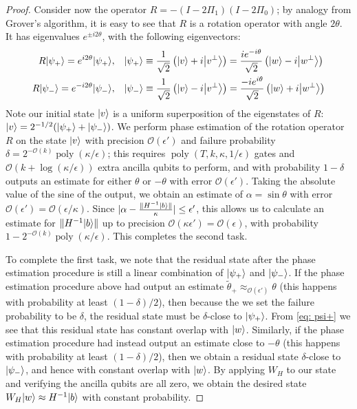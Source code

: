 \documentclass[11pt]{article}
\theoremstyle{definition}
\theoremstyle{remark}
\newcommand\bigoh{\mathcal{O}}
\DeclareMathOperator{\poly}{poly}
\begin{document}
\begin{proof}
Consider now the operator $R=-(I-2\Pi_1)(I-2\Pi_0)$; by analogy from Grover's algorithm, it is easy to see that $R$ is a rotation operator with angle $2\theta$. It has eigenvalues $e^{\pm i2\theta}$, with the following eigenvectors:
\begin{align}
R{\left\vert{\psi_+}\right\rangle} = e^{i2\theta}{\left\vert{\psi_+}\right\rangle},&\quad {\left\vert{\psi_+}\right\rangle} \equiv \frac{1}{\sqrt{2}}\left({\left\vert{v}\right\rangle} + i {\left\vert{v^\perp}\right\rangle} \right) = \frac{ie^{-i\theta}}{\sqrt{2}}\left({\left\vert{w}\right\rangle} - i{\left\vert{w^\perp}\right\rangle} \right) \label{eq: psi+} \\
R{\left\vert{\psi_-}\right\rangle} = e^{-i2\theta}{\left\vert{\psi_-}\right\rangle},&\quad {\left\vert{\psi_-}\right\rangle} \equiv \frac{1}{\sqrt{2}}\left({\left\vert{v}\right\rangle} - i {\left\vert{v^\perp}\right\rangle} \right) = \frac{-ie^{i\theta}}{\sqrt{2}}\left({\left\vert{w}\right\rangle} + i{\left\vert{w^\perp}\right\rangle} \right)
\end{align}
Note our initial state ${\left\vert{v}\right\rangle}$ is a uniform superposition of the eigenstates of $R$: ${\left\vert{v}\right\rangle} = 2^{-1/2} ({\left\vert{\psi_+}\right\rangle} + {\left\vert{\psi_-}\right\rangle})$. We perform phase estimation of the rotation operator $R$ on the state ${\left\vert{v}\right\rangle}$ with precision $\bigoh(\epsilon')$ and failure probability $\delta = 2^{-\bigoh(k)}\poly(\kappa/\epsilon)$; this requires $\poly(T,k,\kappa,1/\epsilon)$ gates and $\bigoh(k+\log(\kappa/\epsilon))$ extra ancilla qubits to perform, and with probability $1-\delta$ outputs an estimate for either $\theta$ or $-\theta$ with error $\bigoh(\epsilon')$. Taking the absolute value of the sine of the output, we obtain an estimate of $\alpha = \sin \theta$ with error $\bigoh(\epsilon') = \bigoh(\epsilon/\kappa)$. Since $|\alpha - \frac{\|H^{-1}{\left\vert{b}\right\rangle}\|}{\kappa}| \le \epsilon'$, this allows us to calculate an estimate for $\|H^{-1}{\left\vert{b}\right\rangle}\|$ up to precision $\mathcal{O}(\kappa \epsilon') = \mathcal{O}(\epsilon)$, with probability $1-2^{-\bigoh(k)}\poly(\kappa/\epsilon)$. This completes the second task.

To complete the first task, we note that the residual state after the phase estimation procedure is still a linear combination of ${\left\vert{\psi_+}\right\rangle}$ and ${\left\vert{\psi_-}\right\rangle}$. If the phase estimation procedure above had output an estimate $\tilde{\theta}_+ \approx_{\bigoh(\epsilon')} \theta$ (this happens with probability at least $(1-\delta)/2$), then because the we set the failure probability to be $\delta$, the residual state must be $\delta$-close to ${\left\vert{\psi_+}\right\rangle}$.  From \eqref{eq: psi+} we see that this residual state has constant overlap with ${\left\vert{w}\right\rangle}$. Similarly, if the phase estimation procedure had instead output an estimate close to $-\theta$ (this happens with probability at least $(1-\delta)/2$), then we obtain a residual state $\delta$-close to ${\left\vert{\psi_-}\right\rangle}$, and hence with constant overlap with ${\left\vert{w}\right\rangle}$. By applying $W_H$ to our state and verifying the ancilla qubits are all zero, we obtain the desired state $W_H{\left\vert{w}\right\rangle}\approx H^{-1}{\left\vert{b}\right\rangle}$ with constant probability.


\end{proof}
\end{document}
